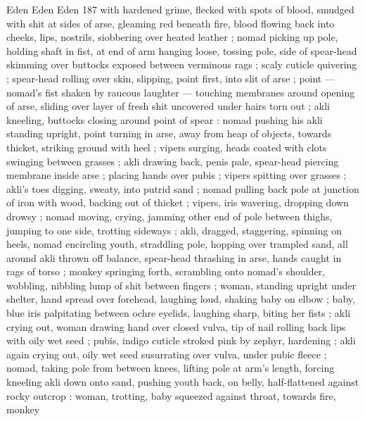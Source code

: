Eden Eden Eden 187
with hardened grime, flecked with spots of blood, smudged with shit
at sides of arse, gleaming red beneath fire, blood flowing back into
cheeks, lips, nostrils, siobbering over heated leather ; nomad picking
up pole, holding shaft in fist, at end of arm hanging loose, tossing
pole, side of spear-head skimming over buttocks exposed between
verminous rags ; scaly cuticle quivering ; spear-head rolling over
skin, slipping, point first, into slit of arse ; point — nomad’s fist
shaken by raucous laughter — touching membranes around opening
of arse, sliding over layer of fresh shit uncovered under hairs torn
out ; akli kneeling, buttocks closing around point of spear : nomad
pushing his akli standing upright, point turning in arse, away from
heap of objects, towards thicket, striking ground with heel ; vipers
surging, heads coated with clots swinging between grasses ; akli
drawing back, penis pale, spear-head piercing membrane inside arse
; placing hands over pubis ; vipers spitting over grasses ; akli’s toes
digging, sweaty, into putrid sand ; nomad pulling back pole at
junction of iron with wood, backing out of thicket ; vipers, iris
wavering, dropping down drowsy ; nomad moving, crying, jamming
other end of pole between thighs, jumping to one side, trotting
sideways ; akli, dragged, staggering, spinning on heels, nomad
encircling youth, straddling pole, hopping over trampled sand, all
around akli thrown off balance, spear-head thrashing in arse, hands
caught in rags of torso ; monkey springing forth, scrambling onto
nomad's shoulder, wobbling, nibbling lump of shit between fingers ;
woman, standing upright under shelter, hand spread over forehead,
laughing loud, shaking baby on elbow ; baby, blue iris palpitating
between ochre eyelids, laughing sharp, biting her fists ; akli crying
out, woman drawing hand over closed vulva, tip of nail rolling back
lips with oily wet seed ; pubis, indigo cuticle stroked pink by zephyr,
hardening ; akli again crying out, oily wet seed susurrating over
vulva, under pubic fleece ; nomad, taking pole from between knees,
lifting pole at arm's length, forcing kneeling akli down onto sand,
pushing youth back, on belly, half-flattened against rocky outcrop :
woman, trotting, baby squeezed against throat, towards fire, monkey

